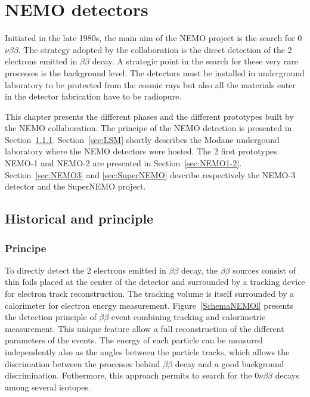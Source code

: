 \documentclass[main.tex]{subfiles}
\begin{document}
\chapter{NEMO detectors}


\NI Initiated in the late 1980s, the main aim of the NEMO project is the search for 0$\nu\beta\beta$. The strategy adopted by the collaboration is the direct detection of the 2 electrons emitted in $\beta\beta$ decay. A strategic point in the search for these very rare processes is the background level. The detectors must be installed in underground laboratory to be protected from the cosmic rays but also all the materials enter in the detector fabrication have to be radiopure.


\bigskip


\NI This chapter presents the different phases and the different prototypes built by the NEMO collaboration. The principe of the NEMO detection is presented in Section~\ref{sec:Principe}. Section~\ref{sec:LSM} shortly describes the Modane undergound laboratory where the NEMO detectors were hosted. The 2 first prototypes NEMO-1 and NEMO-2 are presented in Section~\ref{sec:NEMO1-2}. Section~\ref{sec:NEMO3} and \ref{sec:SuperNEMO} describe respectively the NEMO-3 detector and the SuperNEMO project.


\section{Historical and principle}





\subsection{Principe}\label{sec:Principe}


To directly detect the 2 electrons emitted in $\beta\beta$ decay, the $\beta\beta$ sources consist of thin foils placed at the center of the detector and surrounded by a tracking device for electron track reconstruction. The tracking volume is itself surrounded by a calorimeter for electron energy measurement. Figure~\ref{SchemaNEMOl} presents the detection principle of $\beta\beta$ event combining tracking and calorimetric measurement. This unique feature allow a full reconstruction of the different parameters of the events. The energy of each particle can be measured independently also as the angles between the particle tracks, which allows the discrimation between the processes behind $\beta\beta$ decay and a good background discrimination. Futhermore, this approach permits to search for the 0$\nu\beta\beta$ decays among several isotopes. 
\end{document}
